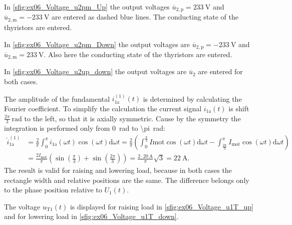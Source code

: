 \begin{solutionblock}
    In \autoref{sfig:ex06_Voltage_u2pm_Up} the output voltages $\overline{u}_\mathrm{2,p}=\SI{233}{\volt}$ and $\overline{u}_\mathrm{2,m}=\SI{-233}{\volt}$
    are entered as dashed blue lines. The conducting state of the thyristors are entered.
    
    

    In \autoref{sfig:ex06_Voltage_u2pm_Down} the output voltages are $\overline{u}_\mathrm{2,p}=\SI{-233}{\volt}$ and $\overline{u}_\mathrm{2,m}=\SI{233}{\volt}$.
    Also here the conducting state of the thyristors are entered.
    
    

    

    \FloatBarrier

    In \autoref{sfig:ex06_Voltage_u2up_down} the output voltages are $\overline{u}_\mathrm{2}$ are entered for both cases.

    

    \FloatBarrier

    The amplitude of the fundamental $i_\mathrm{1a}^\mathrm{(1)}(t)$ is determined by calculating the Fourier coefficient.
    To simplify the calculation the current signal $i_\mathrm{1a}(t)$ is shift $\frac{2 \pi}{3}\SI{}{\radian}$ to the left, 
    so that it is axially symmetric. Cause by the symmetry the integration is performed only from \SI{0}{\radian} to \SI{\pi}{\radian}:
    \begin{equation}
        \begin{split}
            \hat{i}_\mathrm{1a}^\mathrm{(1)} &= \frac{2}{\pi} \int_{0}^{\pi} i_\mathrm{1a}(\omega t) \cos(\omega t) \mathrm{d}\omega t=
            \frac{2}{\pi} \left( \int_{0}^{\frac{\pi}{3}} I\mathrm{mot} \cos(\omega t) \mathrm{d}\omega t 
            - \int_{\frac{2\pi}{3}}^{\pi} I_\mathrm{mot} \cos(\omega t) \mathrm{d}\omega t \right)  \\
            &= \frac{2 I_\mathrm{mot}}{\pi} \left( \sin(\frac{\pi}{3}) + \sin(\frac{2\pi}{3}) \right) 
            = \frac{2\cdot \SI{20}{\ampere}}{\pi} \sqrt{3}= \SI{22}{\ampere}.
        \end{split}
    \end{equation}
    The result is valid for raising and lowering load, because in both cases the rectangle width and relative positions are the same.
    The difference belongs only to the phase position relative to $U_\mathrm{1}(t)$.

    

    
    
    \FloatBarrier

    The voltage $u_\mathrm{T1}(t)$ is displayed for raising load in \autoref{sfig:ex06_Voltage_u1T_up}  and for lowering load in \autoref{sfig:ex06_Voltage_u1T_down}.

    

    
    
\end{solutionblock}

